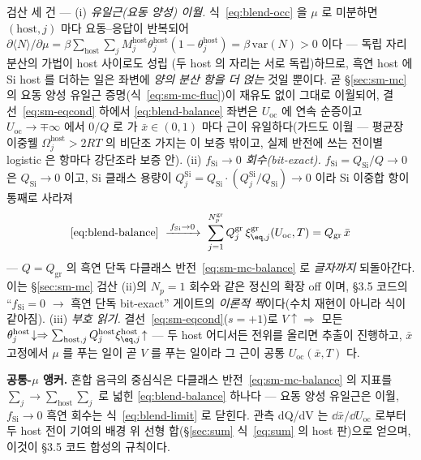 \begin{verifybox}
검산 세 건 --- (i) \emph{유일근(요동 양성) 이월.} 식~\eqref{eq:blend-occ} 을 $\mu$ 로 미분하면
$(\mathrm{host},j)$ 마다 요동--응답이 반복되어
$\partial\langle N\rangle/\partial\mu=\beta\sum_\mathrm{host}\sum_jM_j^\mathrm{host}\theta_j^\mathrm{host}
(1-\theta_j^\mathrm{host})=\beta\,\mathrm{var}(N)>0$ 이다 --- 독립 자리 분산의 가법이 host 사이로도 성립
(두 host 의 자리는 서로 독립)하므로, 흑연 host 에 Si host 를 더하는 일은 좌변에 \emph{양의 분산 항을 더
얹는} 것일 뿐이다. 곧 \S\ref{sec:sm-mc} 의 요동 양성 유일근 증명(식~\eqref{eq:sm-mc-fluc})이 재유도
없이 그대로 이월되어, 결선~\eqref{eq:sm-eqcond} 하에서 \eqref{eq:blend-balance} 좌변은 $U_\mathrm{oc}$
에 연속 순증이고 $U_\mathrm{oc}\to\mp\infty$ 에서 $0/Q$ 로 가 $\bar x\in(0,1)$ 마다 근이 유일하다(가드도
이월 --- 평균장 이중웰 $\Omega_j^\mathrm{host}>2RT$ 의 비단조 가지는 이 보증 밖이고, 실제 반전에 쓰는
전이별 logistic 은 항마다 강단조라 보증 안). (ii) \emph{$f_\mathrm{Si}\to0$ 회수(bit-exact).}
$f_\mathrm{Si}=Q_\mathrm{Si}/Q\to0$ 은 $Q_\mathrm{Si}\to0$ 이고, Si 클래스 용량이
$Q_j^\mathrm{Si}=Q_\mathrm{Si}\cdot(Q_j^\mathrm{Si}/Q_\mathrm{Si})\to0$ 이라 Si 이중합 항이 통째로 사라져
\begin{equation}
\eqref{eq:blend-balance}\ \xrightarrow{\,f_\mathrm{Si}\to0\,}\
\sum_{j=1}^{N_p^\mathrm{gr}}Q_j^\mathrm{gr}\,\xi_{\eq,j}^\mathrm{gr}(U_\mathrm{oc},T)=Q_\mathrm{gr}\,\bar x
\label{eq:blend-limit}
\end{equation}
--- $Q=Q_\mathrm{gr}$ 의 흑연 단독 다클래스 반전~\eqref{eq:sm-mc-balance} 로 \emph{글자까지} 되돌아간다.
이는 \S\ref{sec:sm-mc} 검산 (ii)의 $N_p{=}1$ 회수와 같은 정신의 확장 off 이며, §3.5 코드의
``$f_\mathrm{Si}{=}0$ $\to$ 흑연 단독 bit-exact'' 게이트의 \emph{이론적 짝}이다(수치 재현이 아니라 식이
같아짐). (iii) \emph{부호 읽기.} 결선~\eqref{eq:sm-eqcond}($s{=}+1$)로 $V\!\uparrow\Rightarrow$ 모든
$\theta_j^\mathrm{host}\!\downarrow\Rightarrow\sum_{\mathrm{host},j}Q_j^\mathrm{host}
\xi_{\eq,j}^\mathrm{host}\!\uparrow$ --- 두 host 어디서든 전위를 올리면 추출이 진행하고, $\bar x$ 고정에서
$\mu$ 를 푸는 일이 곧 $V$ 를 푸는 일이라 그 근이 공통 $U_\mathrm{oc}(\bar x,T)$ 다.
\end{verifybox}

\begin{keybox}
\textbf{공통-$\mu$ 앵커.} 혼합 음극의 중심식은 다클래스 반전~\eqref{eq:sm-mc-balance} 의 지표를
$\sum_j\to\sum_\mathrm{host}\sum_j$ 로 넓힌 \eqref{eq:blend-balance} 하나다 --- 요동 양성 유일근은
이월, $f_\mathrm{Si}\to0$ 흑연 회수는 식~\eqref{eq:blend-limit} 로 닫힌다. 관측 dQ/dV 는
$\dd\bar x/\dd U_\mathrm{oc}$ 로부터 두 host 전이 기여의 배경 위 선형 합(\S\ref{sec:sum}
식~\eqref{eq:sum} 의 host 판)으로 얻으며, 이것이 §3.5 코드 합성의 규칙이다.
\end{keybox}

